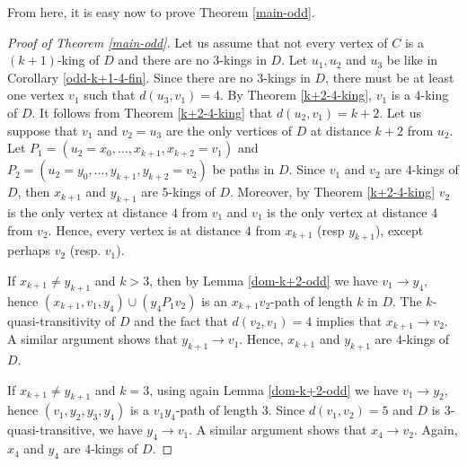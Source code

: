 \documentclass[preprint]{elsarticle}
\begin{document}
From here, it is easy now to prove Theorem \ref{main-odd}.

\begin{proof}[Proof of Theorem \ref{main-odd}]
	Let us assume that not every vertex of $C$ is a $(k+1)$-king of $D$ and there are no $3$-kings in $D$.   Let $u_1, u_2$ and $u_3$ be like in Corollary \ref{odd-k+1-4-fin}.   Since there are no $3$-kings in $D$, there must be at least one vertex $v_1$ such that $d(u_3, v_1) = 4$.   By Theorem \ref{k+2-4-king}, $v_1$ is a $4$-king of $D$.   It follows from Theorem \ref{k+2-4-king} that $d(u_2, v_1) = k+2$.   Let us suppose that $v_1$ and $v_2 = u_3$ are the only vertices of $D$ at distance $k+2$ from $u_2$.   Let $P_1 = (u_2 = x_0, \dots, x_{k+1}, x_{k+2}=v_1)$ and $P_2 = (u_2 = y_0, \dots, y_{k+1}, y_{k+2}=v_2)$ be paths in $D$.   Since $v_1$ and $v_2$ are $4$-kings of $D$, then $x_{k+1}$ and $y_{k+1}$ are $5$-kings of $D$.   Moreover, by Theorem \ref{k+2-4-king} $v_2$ is the only vertex at distance $4$ from $v_1$ and $v_1$ is the only vertex at distance $4$ from $v_2$.   Hence, every vertex is at distance $4$ from $x_{k+1}$ (resp $y_{k+1}$), except perhaps $v_2$ (resp. $v_1$).
	
	If  $x_{k+1} \ne y_{k+1}$ and $k > 3$, then by Lemma \ref{dom-k+2-odd} we have $v_1 \to y_4$, hence $(x_{k+1}, v_1, y_4) \cup (y_4 P_1 v_2)$ is an $x_{k+1} v_2$-path of length $k$ in $D$.   The $k$-quasi-transitivity of $D$ and the fact that $d(v_2, v_1) = 4$ implies that $x_{k+1} \to v_2$.   A similar argument shows that $y_{k+1} \to v_1$.   Hence, $x_{k+1}$ and $y_{k+1}$ are $4$-kings of $D$.
	
	If  $x_{k+1} \ne y_{k+1}$ and $k = 3$, using again Lemma \ref{dom-k+2-odd} we have $v_1 \to y_2$, hence $(v_1, y_2, y_3, y_4)$ is a $v_1 y_4$-path of length $3$.   Since $d(v_1, v_2) = 5$ and $D$ is $3$-quasi-transitive, we have $y_4 \to v_1$.   A similar argument shows that $x_4 \to v_2$.   Again, $x_4$ and $y_4$ are $4$-kings of $D$.
	

\end{proof}
\end{document}
